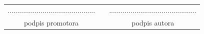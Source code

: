 \documentclass[a4paper,11pt,twoside]{report}
\theoremstyle{definition}
\begin{document}
\sloppy






\thispagestyle{empty}\newpage
\null

\vfill

\begin{center}
\begin{tabular}[t]{ccc}

............................................. & \hspace*{100pt} & .............................................\\
podpis promotora & \hspace*{100pt} & podpis autora


\end{tabular}
\end{center}



\end{document}
